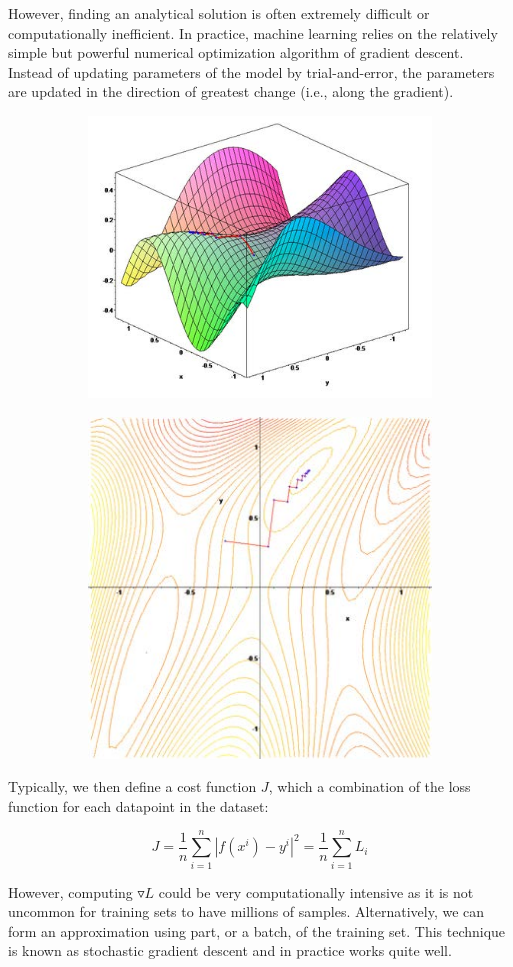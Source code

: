 \documentclass[twoside]{article}
\begin{document}
\noindent However, finding an analytical solution is often extremely difficult or computationally inefficient. In practice, machine learning relies on the relatively simple but powerful numerical optimization algorithm of gradient descent. Instead of updating parameters of the model by trial-and-error, the parameters are updated in the direction of greatest change (i.e., along the gradient).

\begin{figure}[H]
\centering
\begin{subfigure}{.5\textwidth}
  \centering
  \includegraphics[width=.4\linewidth]{pics/lecture_8_num_opt1.jpg}
\end{subfigure}%
\begin{subfigure}{.5\textwidth}
  \centering
  \includegraphics[width=.4\linewidth]{pics/lecture_8_num_opt2.jpg}
\end{subfigure}
\end{figure}

Typically, we then define a cost function $J$, which a combination of the loss function for each datapoint in the dataset:\newline

$$J = \frac{1}{n}\sum_{i=1}^n|f(x^i) - y^i|^2 = \frac{1}{n}\sum_{i=1}^nL_i$$

However, computing $\triangledown L$ could be very computationally intensive as it is not uncommon for training sets to have millions of samples. Alternatively, we can form an approximation using part, or a batch, of the training set. This technique is known as stochastic gradient descent and in practice works quite well.\newline
\end{document}
